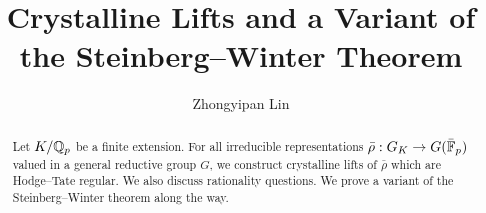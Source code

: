 \documentclass[10pt,a4paper,twoside]{article}
\begin{document}
\newcommand{\altt}{\operatorname{alt}^2}
\newcommand{\socle}{\operatorname{soc}}
\newcommand\nlcup{\mathrel{\ooalign{\hss$\cup$\hss\cr \kern0.7ex\raise0.6ex\hbox{\scalebox{0.4}{$\diamond$}}}}}
\newcommand{\Dynkin}{\operatorname{Dynkin}}
\newcommand{\Siegal}{\operatorname{Siegal}}
\newcommand{\Aut}{\operatorname{Aut}}
\newcommand{\red}{\operatorname{red}}
\newcommand{\ur}{\operatorname{ur}}
\newcommand{\urind}{\operatorname{urind}}
\newcommand{\Isom}{\operatorname{Isom}}
\newcommand{\IsomFil}{\operatorname{Isom-fil}}
\newcommand{\crys}{\operatorname{crys}}
\newcommand{\can}{\operatorname{can}}
\newcommand{\val}{\operatorname{val}_p}
\newcommand{\irr}{\operatorname{irr}}
\newcommand{\sems}{\operatorname{ss}}
\newcommand{\std}{\operatorname{std}}
\newcommand{\Vect}{\operatorname{Vect}}
\newcommand{\der}{\operatorname{der}}
\newcommand{\Ord}{\operatorname{Ord}}
\newcommand{\gr}{\operatorname{gr}}
\newcommand{\Res}{\operatorname{Res}}
\newcommand{\res}{\operatorname{res}}
\newcommand{\Rep}{\operatorname{Rep}}
\newcommand{\Tor}{\operatorname{Tor}}
\newcommand{\ab}{\operatorname{ab}}
\newcommand{\noyaux}[1]{\operatorname{ker}{#1}}
\newcommand{\spa}{\operatorname{Spa}}
\newcommand{\spec}{\operatorname{Spec}}
\newcommand{\spf}{\operatorname{Spf}}
\newcommand{\Span}{\operatorname{span}}
\newcommand{\opn}[1]{\operatorname{#1}}
\newcommand{\dirlim}[1]{\underset{#1}{\underrightarrow{\operatorname{lim}}}}
\newcommand{\invlim}[1]{\underset{#1}{\underleftarrow{\operatorname{lim}}}}

\title{Crystalline Lifts and a Variant of the Steinberg--Winter Theorem}
\date{}
\author{Zhongyipan Lin}
\maketitle
\begin{abstract}
Let $K/\mathbb{Q}_p$ be a finite extension.
For all irreducible representations
$\bar\rho: G_K \to G(\bar{\mathbb{F}}_p)$
valued in a general reductive group $G$,
we construct crystalline lifts
of $\bar\rho$ which are Hodge--Tate regular.
We also discuss rationality questions.
We prove a variant of the Steinberg--Winter theorem
along the way.
\end{abstract}
\end{document}
